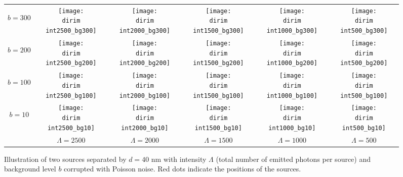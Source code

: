 \begin{figure}[!hbt]
	\centering
	\newcommand{\wf}{.15\textwidth}
	\newcommand{\dirim}{\qd gFREM/images/psf2/twosources_}
	\newcommand{\vs}{.4}
	\begin{tabular}{c|ccccc}
		\begin{sideways}\hspace{\vs cm}$b=300$\end{sideways}
		&\texttt{[image: \\dirim int2500\_bg300]}
		&\texttt{[image: \\dirim int2000\_bg300]}
		&\texttt{[image: \\dirim int1500\_bg300]}
		&\texttt{[image: \\dirim int1000\_bg300]}
		&\texttt{[image: \\dirim int500\_bg300]}\\
		\begin{sideways}\hspace{\vs cm}$b=200$\end{sideways}
		&\texttt{[image: \\dirim int2500\_bg200]}
		&\texttt{[image: \\dirim int2000\_bg200]}
		&\texttt{[image: \\dirim int1500\_bg200]}
		&\texttt{[image: \\dirim int1000\_bg200]}
		&\texttt{[image: \\dirim int500\_bg200]}\\
		\begin{sideways}\hspace{\vs cm}$b=100$\end{sideways}
		&\texttt{[image: \\dirim int2500\_bg100]}
		&\texttt{[image: \\dirim int2000\_bg100]}
		&\texttt{[image: \\dirim int1500\_bg100]}
		&\texttt{[image: \\dirim int1000\_bg100]}
		&\texttt{[image: \\dirim int500\_bg100]}\\
		\begin{sideways}\hspace{\vs cm}$b=10$\end{sideways}
		&\texttt{[image: \\dirim int2500\_bg10]}
		&\texttt{[image: \\dirim int2000\_bg10]}
		&\texttt{[image: \\dirim int1500\_bg10]}
		&\texttt{[image: \\dirim int1000\_bg10]}
		&\texttt{[image: \\dirim int500\_bg10]}\\
		\hline	
		&$\Lambda=2500$ & $\Lambda=2000$ & $\Lambda=1500$ & $\Lambda=1000$ & $\Lambda=500$\\
	\end{tabular}
	\caption{Illustration of two sources separated by $d=40$ nm with intensity $\Lambda$ (total number of emitted photons per source) and background level $b$ corrupted with Poisson noise. Red dots indicate the positions of the sources.}
	\label{fig:two sources int bg}
\end{figure}



